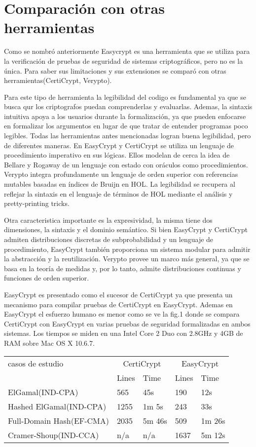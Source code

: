 \documentclass[runningheads]{llncs}
\begin{document}
\section{Comparación con otras herramientas}
Como se nombró anteriormente Easycrypt es una herramienta que se utiliza para la verificación de pruebas de seguridad de sistemas criptográficos, pero no es la única. Para saber sus limitaciones y sus extensiones se comparó con otras herramientas(CertiCrypt, Verypto).

 Para este tipo de herramienta la legibilidad del codigo es fundamental ya que se busca qur los criptografos puedan comprenderlas y evaluarlas. Ademas, la sintaxis intuitiva apoya a los usuarios durante la formalización, ya que pueden enfocarse en formalizar los argumentos en lugar de que tratar de entender programas poco legibles. Todas las herramientas antes mencionadas logran buena legibilidad, pero de diferentes maneras. En EasyCrypt y CertiCrypt se utiliza un lenguaje de procedimiento imperativo en sus lógicas. Ellos modelan de cerca la idea de Bellare y Rogaway de un lenguaje con estado con oráculos como procedimientos\cite{ref_article3}. Verypto integra profundamente un lenguaje de orden superior con referencias mutables basadas en índices de Bruijn en HOL\cite{ref_article4}. La legibilidad se recupera al reflejar la sintaxis en el lenguaje de términos de HOL mediante el análisis y pretty-printing tricks.

 Otra caracteristica importante es la expresividad, la misma tiene dos dimensiones, la sintaxis y el dominio semántico. Si bien EasyCrypt y CertiCrypt admiten distribuciones discretas de subprobabilidad y un lenguaje de procedimiento, EasyCrypt también proporciona un sistema modular para admitir la abstracción y la reutilización. Verypto provee un marco más general, ya que se basa en la teoría de medidas y, por lo tanto, admite distribuciones continuas y funciones de orden superior.
 
EasyCrypt es presentado como el sucesor de CertiCrypt ya que  presenta un mecanismo para compilar pruebas de CertiCrypt en EasyCrypt. Ademas en EasyCrypt el esfuerzo humano es menor como se ve la fig.1 donde se compara CertiCrypt con EasyCrypt en varias pruebas de seguridad formalizadas en ambos sistemas. Los tiempos se miden en una Intel Core 2 Duo con 2.8GHz y 4GB de RAM sobre Mac OS X 10.6.7.



\begin{tabular}{ |p{3cm}|p{3cm}|p{3cm}|p{3cm}|p{3cm}|  }
 \hline
 casos de estudio & \multicolumn{2}{|c|}{CertiCrypt} & \multicolumn{2}{|c|}{EasyCrypt} \\
 
 &Lines&Time&Lines&Time\\
 \hline
 ElGamal(IND-CPA)   & 565    &45s &190 &12s \\
 Hashed ElGamal(IND-CPA)& 1255  & 1m 5s & 243  & 33s\\
 Full-Domain Hash(EF-CMA) &2035 & 5m 46s&  509 & 1m 26s\\
 Cramer-Shoup(IND-CCA)    &n/a & n/a& 1637 &5m 12s\\
 \hline
\end{tabular}
\end{document}
